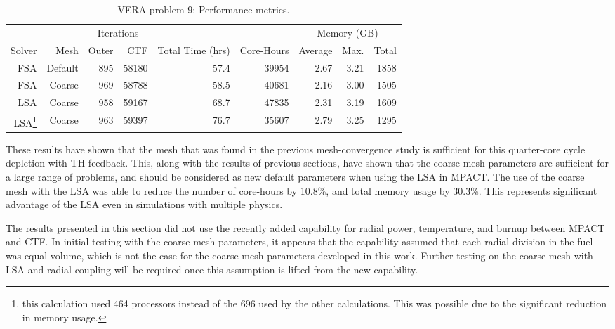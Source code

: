 {{{      \begin{table}[htbp]
        \centering
        \caption{VERA problem 9: Performance metrics.\label{tab:LSMOC:P9:Performance}}
        \begin{tabular}{rrrrrrrrr}\toprule
                 &      & \multicolumn{2}{c}{Iterations} & & & \multicolumn{3}{c}{Memory (GB)}\\\cline{3-4}\cline{7-9}
          Solver & Mesh    & Outer &   CTF & Total Time (hrs) & Core-Hours & Average & Max. & Total\\\midrule
             FSA & Default &   895 & 58180 &            57.4  &      39954 &    2.67 & 3.21 & 1858\\
             FSA &  Coarse\footnotemark[1] &   969 & 58788 &            58.5  &      40681 &    2.16 & 3.00 & 1505\\
             LSA &  Coarse\footnotemark[1] &   958 & 59167 &            68.7  &      47835 &    2.31 & 3.19 & 1609\\
             LSA\footnote{this calculation used 464 processors instead of the 696 used by the other calculations. This was possible due to the significant reduction in memory usage.}
                 & Coarse  & 963 & 59397 & 76.7 & 35607 & 2.79 & 3.25 & 1295\\\bottomrule
        \end{tabular}
      \end{table}

      These results have shown that the mesh that was found in the previous mesh-convergence study is sufficient for this quarter-core cycle depletion with \ac{TH} feedback.
      This, along with the results of previous sections, have shown that the coarse mesh parameters are sufficient for a large range of problems, and should be considered as new default parameters when using the \ac{LSA} in MPACT.
      The use of the coarse mesh with the \ac{LSA} was able to reduce the number of core-hours by 10.8\%, and total memory usage by 30.3\%.
      This represents significant advantage of the \ac{LSA} even in simulations with multiple physics.

      The results presented in this section did not use the recently added capability for radial power, temperature, and burnup between MPACT and CTF.
      In initial testing with the coarse mesh parameters, it appears that the capability assumed that each radial division in the fuel was equal volume, which is not the case for the coarse mesh parameters developed in this work.
      Further testing on the coarse mesh with \ac{LSA} and radial coupling will be required once this assumption is lifted from the new capability.
    }
  }
}
